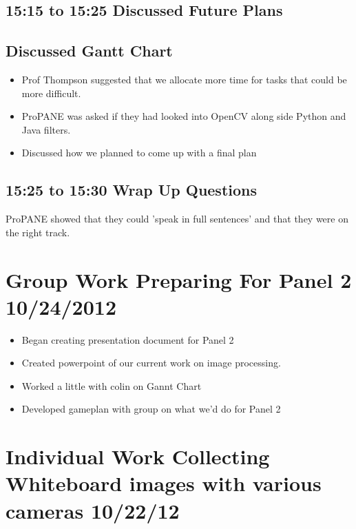 \documentclass[]{article}
\begin{document}
			\subsection{15:15 to 15:25 Discussed Future Plans}
				
				\subsection*{Discussed Gantt Chart}
					\begin{itemize}
						\item Prof Thompson suggested that we allocate more time for tasks that could be more difficult.
						\item ProPANE was asked if they had looked into OpenCV along side Python and Java filters. 
						\item Discussed how we planned to come up with a final plan
					\end{itemize}
				
			
			\subsection*{15:25 to 15:30 Wrap Up Questions}
				
				ProPANE showed that they could 'speak in full sentences' and that they were on the right track.
	
	\section{Group Work Preparing For Panel 2 10/24/2012}
		\begin{itemize}
			\item Began creating presentation document for Panel 2
			\item Created powerpoint of our current work on image processing.
			\item Worked a little with colin on Gannt Chart
			\item Developed gameplan with group on what we'd do for Panel 2
		\end{itemize}
			
	\section{Individual Work Collecting Whiteboard images with various cameras 10/22/12}
\end{document}
